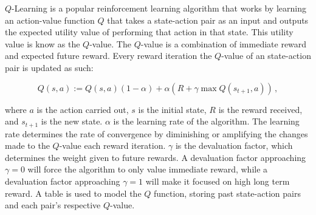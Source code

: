 $Q$-Learning \cite{watkins} is a popular reinforcement learning algorithm that works by learning an action-value function $Q$ that takes a state-action pair as an input and outputs the expected utility value of performing that action in that state.
This utility value is know as the $Q$-value.
The $Q$-value is a combination of immediate reward and expected future reward.
Every reward iteration the $Q$-value of an state-action pair is updated as such:

\begin{equation}
	Q(s, a) := Q(s, a)(1 - \alpha) + \alpha(R + \gamma \max Q(s_{t+1}, a))
	\,,
	\label{equ::updateqlearn}
\end{equation}

\noindent
where $a$ is the action carried out, $s$ is the initial state, $R$ is the reward received, and $s_{t+1}$ is the new state.
$\alpha$ is the learning rate of the algorithm.
The learning rate determines the rate of convergence by diminishing or amplifying the changes made to the $Q$-value each reward iteration.
$\gamma$ is the devaluation factor, which determines the weight given to future rewards.
A devaluation factor approaching $\gamma=0$ will force the algorithm to only value immediate reward, while a devaluation factor approaching $\gamma=1$ will make it focused on high long term reward.
 A table is used to model the $Q$ function, storing past state-action pairs and each pair's respective $Q$-value.
